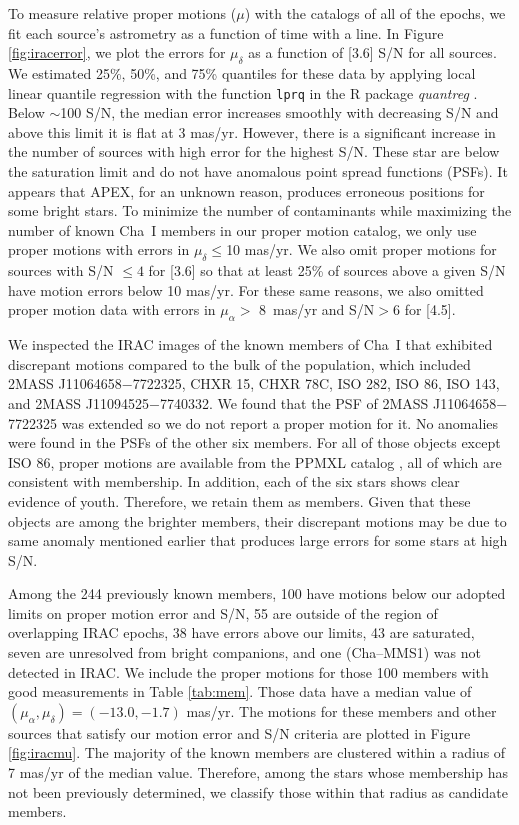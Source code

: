 \documentclass{emulateapj}
\begin{document}
To measure relative proper motions ($\mu$) with the catalogs of all of the 
epochs, we fit each source's astrometry as a function of time with a line.
In Figure \ref{fig:iracerror},
we plot the errors for $\mu_\delta$ as a function of [3.6] S/N for all sources.
We estimated 25\%, 50\%, and 75\% quantiles for these data 
by applying local linear quantile regression with the function 
{\tt lprq} in the R package {\it quantreg} \citep{koe16}. Below $\sim$100 S/N,
the median error increases smoothly with decreasing S/N
and above this limit it is flat at 3 mas/yr.
However, there is a significant increase in the number of 
sources with high error for the highest S/N. 
These star are below the saturation limit and 
do not have anomalous point spread functions (PSFs). 
It appears that APEX, for an unknown reason, 
produces erroneous positions for some bright stars.
To minimize the number of contaminants while maximizing the number of known Cha~I members in our 
proper motion catalog, we only use proper motions with errors in $\mu_\delta \leq$10 mas/yr.
We also omit proper motions for sources with S/N $\leq4$ for [3.6]
so that at least 25\% of sources above a given S/N have motion errors below 10 mas/yr.
For these same reasons, we also omitted proper motion data with
errors in $\mu_\alpha >$ 8~mas/yr and S/N$>6$ for [4.5].

We inspected the IRAC images of the known members of Cha~I 
that exhibited discrepant motions compared to the bulk of the population,
which included 2MASS J11064658$-$7722325, CHXR 15, CHXR 78C, ISO 282,
ISO 86, ISO 143, and 2MASS J11094525$-$7740332.
We found that the PSF of 2MASS J11064658$-$7722325 was extended so we do
not report a proper motion for it.
No anomalies were found in the PSFs of the other six members.
For all of those objects except ISO 86,
proper motions are available from the PPMXL catalog \citep{roe10},
all of which are consistent with membership. 
In addition, each of the six stars shows clear evidence of youth.
Therefore, we retain them as members. 
Given that these objects are among the brighter members,
their discrepant motions may be due to same anomaly mentioned earlier that
produces large errors for some stars at high S/N.

Among the 244 previously known members, 
100 have motions below our adopted limits on proper motion error and S/N,
55 are outside of the region of overlapping IRAC epochs,
38 have errors above our limits,
43 are saturated,
seven are unresolved from bright companions,
and one (Cha--MMS1) was not detected in IRAC.
We include the proper motions for those 100 members with good measurements 
in Table \ref{tab:mem}. Those data have a median value of
$(\mu_\alpha, \mu_\delta) = (-13.0, -1.7)$ mas/yr. The motions for these
members and other sources that satisfy our motion error and S/N criteria 
are plotted in Figure \ref{fig:iracmu}.
The majority of the known members 
are clustered within a radius of 7 mas/yr of the median value. Therefore, 
among the stars whose membership has not been previously determined,
we classify those within that radius as candidate members. 
\end{document}
